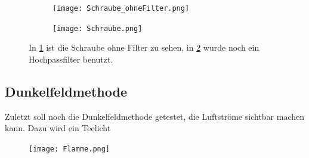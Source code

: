 \begin{figure}[h]
	\begin{subfigure}[c]{0.5\textwidth}
		
		\texttt{[image: Schraube\_ohneFilter.png]}
		\caption{}
		\label{fig:Schraube}
		
	\end{subfigure}
	\begin{subfigure}[c]{0.5\textwidth}
		\texttt{[image: Schraube.png]}
		\caption{}
		\label{fig:Schraube_Filter}
	\end{subfigure}
	\caption{In \cref{fig:Schraube} ist die Schraube ohne Filter zu sehen, in \cref{fig:Schraube_Filter} wurde noch ein Hochpassfilter benutzt.}
	\label{Schraube}
\end{figure}  

\subsection{Dunkelfeldmethode}
Zuletzt soll noch die Dunkelfeldmethode getestet, die Luftströme sichtbar machen kann. Dazu wird ein Teelicht 

\begin{figure}[h!]
	\centering
	\texttt{[image: Flamme.png]}
	\caption{}
	\label{Flamme}
\end{figure}
